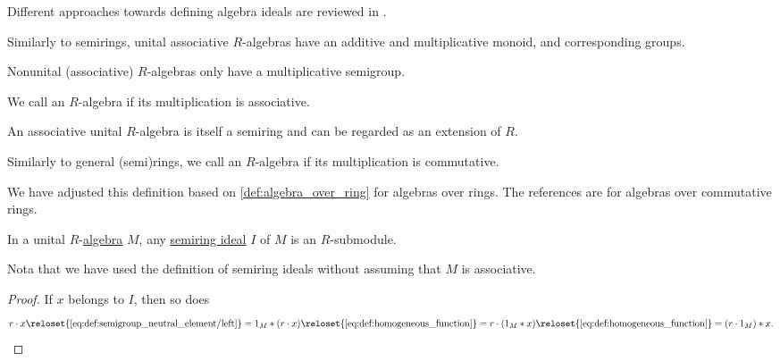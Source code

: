 \begin{definition}
\begin{thmenum}
    Different approaches towards defining algebra ideals are reviewed in .

    \mimprovised Similarly to semirings, unital associative \( R \)-algebras have an additive and multiplicative monoid, and corresponding groups.

    Nonunital (associative) \( R \)-algebras only have a multiplicative semigroup.

     We call an \( R \)-algebra  if its multiplication is associative.

    An associative unital \( R \)-algebra is itself a semiring and can be regarded as an extension of \( R \).

     Similarly to general (semi)rings, we call an \( R \)-algebra  if its multiplication is commutative.
  \end{thmenum}
\end{definition}
\begin{comments}
  \item We have adjusted this definition based on \cref{def:algebra_over_ring} for algebras over rings. The references are for algebras over commutative rings.
\end{comments}

\begin{proposition}\label{thm:algebra_over_semiring_ideal_is_submodule}
  In a unital \( R \)-\hyperref[def:algebra_over_semiring]{algebra} \( M \), any \hyperref[def:semiring_ideal]{semiring ideal} \( I \) of \( M \) is an \( R \)-submodule.
\end{proposition}
\begin{comments}
  \item Nota that we have used the definition of semiring ideals without assuming that \( M \) is associative.
\end{comments}
\begin{proof}
  If \( x \) belongs to \( I \), then so does
  \begin{equation*}
    r \cdot x
    \reloset {\eqref{eq:def:semigroup_neutral_element/left}} =
    1_M \ast (r \cdot x)
    \reloset {\eqref{eq:def:homogeneous_function}} =
    r \cdot (1_M \ast x)
    \reloset {\eqref{eq:def:homogeneous_function}} =
    (r \cdot 1_M) \ast x.
  \end{equation*}
\end{proof}

